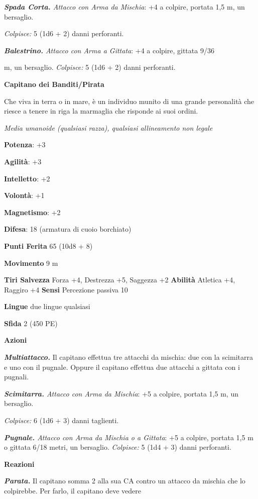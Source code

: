 \begin{multicols}{2}
\emph{\textbf{Spada Corta.} Attacco con Arma da Mischia}: +4 a colpire,
portata 1,5 m, un bersaglio.

\emph{Colpisce:} 5 (1d6 + 2) danni perforanti.

\emph{\textbf{Balestrino.} Attacco con Arma a Gittata}: +4 a colpire,
gittata 9/36

m, un bersaglio. \emph{Colpisce:} 5 (1d6 + 2) danni perforanti.



\textbf{Capitano dei Banditi/Pirata}

Che viva in terra o in mare, è un individuo munito di una grande
personalità che riesce a tenere in riga la marmaglia che risponde ai
suoi ordini.

\emph{Media umanoide (qualsiasi razza), qualsiasi allineamento non
legale}

\textbf{Potenza}: +3

\textbf{Agilità}: +3

\textbf{Intelletto}: +2

\textbf{Volontà}: +1

\textbf{Magnetismo}: +2

\textbf{Difesa}: 18 (armatura di cuoio borchiato)

\textbf{Punti Ferita} 65 (10d8 + 8)

\textbf{Movimento} 9 m

\textbf{Tiri Salvezza} Forza +4, Destrezza +5, Saggezza +2
\textbf{Abilità} Atletica +4, Raggiro +4 \textbf{Sensi} Percezione
passiva 10

\textbf{Lingue} due lingue qualsiasi

\textbf{Sfida} 2 (450 PE)

\textbf{Azioni}

\emph{\textbf{Multiattacco.}} Il capitano effettua tre attacchi da
mischia: due con la scimitarra e uno con il pugnale. Oppure il capitano
effettua due attacchi a gittata con i pugnali.

\emph{\textbf{Scimitarra.} Attacco con Arma da Mischia}: +5 a colpire,
portata 1,5 m, un bersaglio.

\emph{Colpisce:} 6 (1d6 + 3) danni taglienti.

\emph{\textbf{Pugnale.} Attacco con Arma da Mischia o a Gittata}: +5 a
colpire, portata 1,5 m o gittata 6/18 metri, un bersaglio.
\emph{Colpisce:} 5 (1d4 + 3) danni perforanti.

\textbf{Reazioni}

\emph{\textbf{Parata.}} Il capitano somma 2 alla sua CA contro un
attacco da mischia che lo colpirebbe. Per farlo, il capitano deve vedere


\end{multicols}
